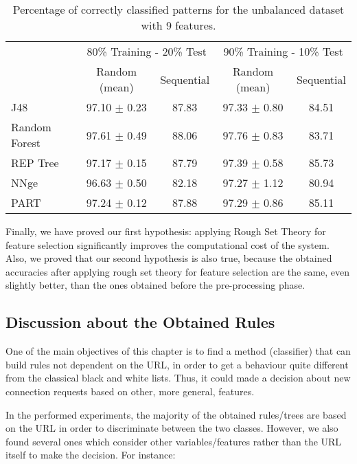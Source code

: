 \documentclass{llncs}
\begin{document}
\begin{table*}[htpb]
\centering
 \caption{\label{tab_featselect} Percentage of correctly classified patterns for the unbalanced dataset with 9 features.}
{\small
\begin{tabular}{|l|c|c|c|c|}
\cline{2-5}
\multicolumn{1}{l|}{} & \multicolumn{2}{c|}{80\% Training - 20\% Test} & \multicolumn{2}{c|}{90\% Training - 10\% Test} \\
\cline{2-5}
\multicolumn{1}{l|}{} & Random (mean) & Sequential & Random (mean) & Sequential \\
\hline
J48 & 97.10 $\pm$ 0.23 & 87.83 & 97.33 $\pm$ 0.80 & 84.51 \\
\cline{1-1}
Random Forest & 97.61 $\pm$ 0.49 & 88.06 & 97.76 $\pm$ 0.83 & 83.71 \\
\cline{1-1}
REP Tree & 97.17 $\pm$ 0.15 & 87.79 & 97.39 $\pm$ 0.58 & 85.73 \\
\cline{1-1}
NNge & 96.63 $\pm$ 0.50 & 82.18 & 97.27 $\pm$ 1.12 & 80.94 \\
\cline{1-1}
PART & 97.24 $\pm$ 0.12 & 87.88 & 97.29 $\pm$ 0.86 & 85.11 \\
\hline
\end{tabular}
}
\end{table*}

Finally, we have proved our first hypothesis: applying Rough Set Theory for feature selection significantly improves the computational cost of the system. Also, we proved that our second hypothesis is also true, because the obtained accuracies after applying rough set theory for feature selection are the same, even slightly better, than the ones obtained before the pre-processing phase.

\subsection{Discussion about the Obtained Rules}
\label{subsec:rulesdiscussion}

One of the main objectives of this chapter is to find a method (classifier) that can build rules not dependent on the URL, in order to get a behaviour quite different from the classical black and white lists. Thus, it could made a decision about new connection requests based on other, more general, features.

In the performed experiments, the majority of the obtained rules/trees are based on the URL in order to discriminate between the two classes. However, we also found several ones which consider other variables/features rather than the URL itself to make the decision. For instance:\\
\end{document}
